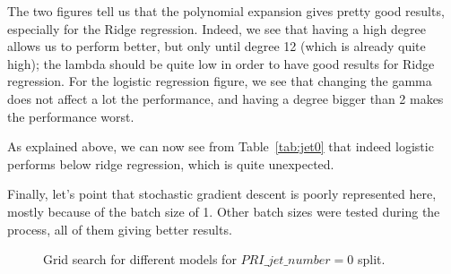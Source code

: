 \documentclass[10pt,conference,compsocconf]{IEEEtran}
\begin{document}
The two figures tell us that the polynomial expansion gives pretty good results, especially for the Ridge regression. Indeed, we see that having a high degree allows us to perform better, but only until degree 12 (which is already quite high); the lambda should be quite low in order to have good results for Ridge regression. For the logistic regression figure, we see that changing the gamma does not affect a lot the performance, and having a degree bigger than 2 makes the performance worst.

As explained above, we can now see from Table~\ref{tab:jet0} that indeed logistic performs below ridge regression, which is quite unexpected. 

Finally, let's point that stochastic gradient descent is poorly represented here, mostly because of the batch size of 1. Other batch sizes were tested during the process, all of them giving better results.

\begin{figure}
\centering
{}
\newline
{}
\caption{Grid search for different models for $PRI\_jet\_number=0$ split.}
\label{fig:plots}
\end{figure}
\end{document}
